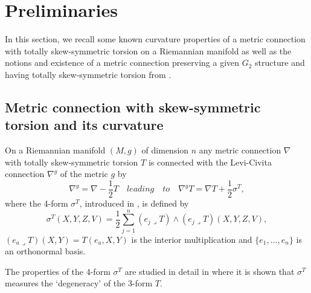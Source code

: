 \documentclass[10pt,british]{article}
\def\sb {{\nabla}}
\def\LC{{\nabla^g}}
\begin{document}
 



 

\section{Preliminaries}
In this section, we recall some known curvature properties of a metric connection with totally skew-symmetric torsion on a Riemannian manifold as well as 
the notions and existence of a metric  connection preserving a given $G_2$ structure and having totally skew-symmetric torsion from \cite{I,FI,IS}. 
\subsection{Metric connection with skew-symmetric  torsion and its curvature}
On a Riemannian manifold $(M,g)$ of dimension $n$ any metric connection $\sb$ with totally skew-symmetric torsion $T$ is connected with the Levi-Civita connection $\sb^g$ of the metric $g$ by
\begin{equation}\label{tsym}
\sb^g=\sb- \frac12T \quad leading\quad to \quad \LC T=\sb T+\frac12\sigma^T,
\end{equation}
where the 4-form $\sigma^T$, introduced in \cite{FI}, is defined by
 \begin{equation}\label{sigma}
 \sigma ^T(X,Y,Z,V)=\frac12\sum_{j=1}^n(e_j\lrcorner T)\wedge(e_j\lrcorner T)(X,Y,Z,V), %
\end{equation} 
   $(e_a\lrcorner T)(X,Y)=T(e_a,X,Y)$ is the interior multiplication and $\{e_1,\dots,e_n\}$ is an orthonormal  basis.

The properties of the 4-form $\sigma^T$ are studied in detail in \cite{AFF} where it is shown that $\sigma^T$ measures the `degeneracy' of the 3-form $T$.
\end{document}
